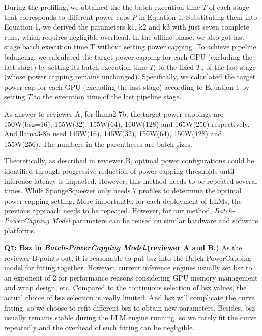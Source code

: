 During the profiling, we obtained the the batch execution time $T$ of each stage that corresponds to different power caps $P$ in Equation 1.
Substituting them into Equation 1, we derived the parameters k1, k2 and k3 with just seven complete runs, which requires negligible overhead.
In the offline phase, we also got last-stage batch execution time T without setting power capping. 
To achieve pipeline balancing, we calculated the target power capping for each GPU (excluding the last stage) by setting its batch execution time $T_i$ to the fixed $T_n$ of the last stage (whose power capping remains unchanged).
Specifically, we calculated the target power cap for each GPU (excluding the last stage) according to Equation 1 by setting $T$ to the execution time of the last pipeline stage.

As answer to reviewer A, for llama2-7b, the target power cappings are 150W(bsz=16), 155W(32), 155W(64), 160W(128) and 165W(256) respectively. 
And llama3-8b used 145W(16), 145W(32), 150W(64), 150W(128) and 155W(256).
The numbers in the parentheses are batch sizes.

Theoretically, as described in reviewer B, optimal power configurations could be identified through progressive reduction of power capping thresholds until inference latency is impacted.
However, this method needs to be repeated several times. 
While SpongeSqueezer only needs 7 profiles to determine the optimal power capping setting.
More importantly, for each deployment of LLMs, the previous approach needs to be repeated. 
However, for our method, \textit{Batch-PowerCapping Model} parameters can be reused on similar hardware and software platforms.





\textbf{Q7: Bsz in \textit{Batch-PowerCapping Model}.(reviewer A and B.)} 
As the reviewer B points out, it is reasonable to put bsz into the Batch-PowerCapping model for fitting together.
However, current inference engines usually set bsz to an exponent of 2 for performance reasons considering GPU memory management and wrap design, etc.
Compared to the continuous selection of bsz values, the actual choice of bsz selection is really limited.
And bsz will complicate the curve fitting, so we choose to refit different bsz to obtain new parameters.
Besides, bsz usually remains stable during the LLM engine running, so we rarely fit the curve repeatedly and the overhead of such fitting can be negligible.



